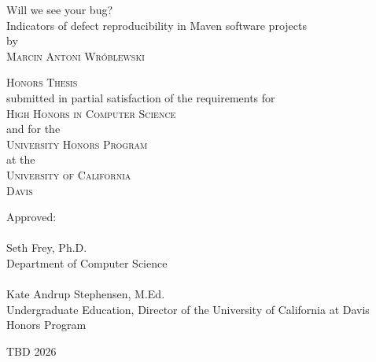 \begin{center}
   \null\vfill
      {\Large Will we see your bug?}
      \\
      \bigskip
      {\Large Indicators of defect reproducibility in Maven software projects}
   \\
   \bigskip
   by \\
   \bigskip
  \textsc{Marcin Antoni Wróblewski} \\
   \vfill
\end{center}
\begin{center}
   \null\vfill
   \textsc{Honors Thesis} \\
   \bigskip
   submitted in partial satisfaction of the requirements for \\
   \bigskip
   \textsc{High Honors in Computer Science} \\
   \bigskip
   and for the \\
   \bigskip
   \textsc{University Honors Program} \\
   \bigskip
   at the \\
   \bigskip
   \textsc{University of California} \\
   \bigskip
   \textsc{Davis} \\
   \vfill
\end{center}
\begin{flushleft}
   \null\vfill
   Approved: \\
   \bigskip
   \bigskip
   \makebox[3in]{\hrulefill} \\
   Seth Frey, Ph.D. \\
   Department of Computer Science \\
   \bigskip
   \bigskip
   \makebox[3in]{\hrulefill} \\
   Kate Andrup Stephensen, M.Ed. \\
   Undergraduate Education, Director of the University of California at Davis Honors Program \\
   \bigskip
   \vfill
\end{flushleft}
\begin{center}
   \null\vfill
   TBD 2026 \\
   \vfill
\end{center}

